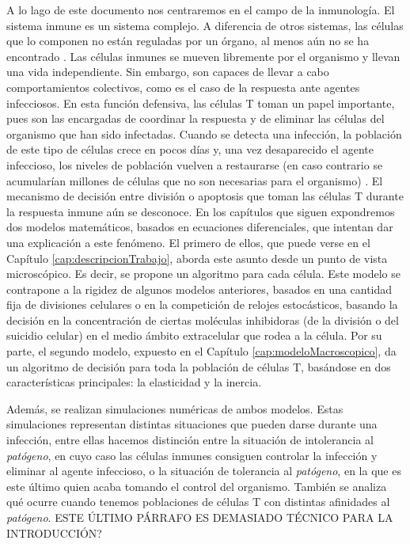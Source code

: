 A lo lago de este documento nos centraremos en el campo de la inmunología. El sistema inmune es un sistema complejo. A diferencia de otros sistemas, las células que lo componen no están reguladas por un órgano, al menos aún no se ha encontrado \citep{arias2016emergent}. Las células inmunes se mueven libremente por el organismo y llevan una vida independiente. Sin embargo, son capaces de llevar a cabo comportamientos colectivos, como es el caso de la respuesta ante agentes infecciosos. En esta función defensiva, las células T toman un papel importante, pues son las encargadas de coordinar la respuesta y de eliminar las células del organismo que han sido infectadas. Cuando se detecta una infección, la población de este tipo de células crece en pocos días y, una vez desaparecido el agente infeccioso, los niveles de población vuelven a restaurarse (en caso contrario se acumularían millones de células que no son necesarias para el organismo) \citep{fernandez2012mecanica}. El mecanismo de decisión entre división o apoptosis que toman las células T durante la respuesta inmune aún se desconoce. En los capítulos que siguen expondremos dos modelos matemáticos, basados en ecuaciones diferenciales, que intentan dar una explicación a este fenómeno. El primero de ellos, que puede verse en el Capítulo \ref{cap:descripcionTrabajo}, aborda este asunto desde un punto de vista microscópico. Es decir, se propone un algoritmo para cada célula. Este modelo se contrapone a la rigidez de algunos modelos anteriores, basados en una cantidad fija de divisiones celulares o en la competición de relojes estocásticos, basando la decisión en la concentración de ciertas moléculas inhibidoras (de la división o del suicidio celular) en el medio ámbito extracelular que rodea a la célula. Por su parte, el segundo modelo, expuesto en el Capítulo \ref{cap:modeloMacroscopico}, da un algoritmo de decisión para toda la población de células T, basándose en dos características principales: la elasticidad y la inercia.
 
Además, se realizan simulaciones numéricas de ambos modelos. Estas simulaciones representan distintas situaciones que pueden darse durante una infección, entre ellas hacemos distinción entre la situación de intolerancia al \textit{patógeno}, en cuyo caso las células inmunes consiguen controlar la infección y eliminar al agente infeccioso, o la situación de tolerancia al \textit{patógeno}, en la que es este último quien acaba tomando el control del organismo. También se analiza qué ocurre cuando tenemos poblaciones de células T con distintas afinidades al \textit{patógeno}. ESTE ÚLTIMO PÁRRAFO ES DEMASIADO TÉCNICO PARA LA INTRODUCCIÓN?

